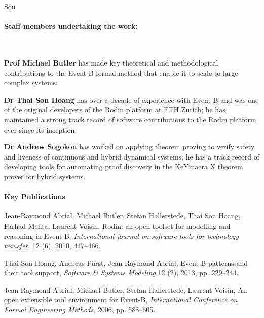 \begin{sitedescription}{Sou}

\paragraph*{Staff members undertaking the work:}~\newline 

\textbf{Prof Michael Butler} has made key theoretical and methodological contributions to the Event-B formal method that enable it to scale to large complex systems.

\textbf{Dr Thai Son Hoang} has over a decade of experience with Event-B and was one of the original developers of the Rodin platform at ETH Zurich; he has maintained a strong track record of software contributions to the Rodin platform ever since its inception.

\textbf{Dr Andrew Sogokon} has worked on applying theorem proving to verify safety and liveness of continuous and hybrid dynamical systems; he has a track record of developing tools for automating proof discovery in the KeYmaera X theorem prover for hybrid systems.

\paragraph*{Key Publications} 

\begin{compactitem}
\item Jean-Raymond Abrial, Michael Butler, Stefan Hallerstede, Thai Son Hoang, Farhad Mehta, Laurent Voisin,
	Rodin: an open toolset for modelling and reasoning in Event-B.
{\em International journal on software tools for technology transfer}, 12 (6), 2010, 447--466.
\item 
Thai Son Hoang, Andreas F\"urst, Jean-Raymond Abrial,
Event-B patterns and their tool support,
{\em Software \& Systems Modeling } 12 (2), 2013, pp. 229--244.


\item Jean-Raymond Abrial, Michael Butler, Stefan Hallerstede, Laurent Voisin,
	An open extensible tool environment for Event-B,
	{\em International Conference on Formal Engineering Methods}, 2006, pp. 588--605. 
\end{compactitem}


\end{sitedescription}

